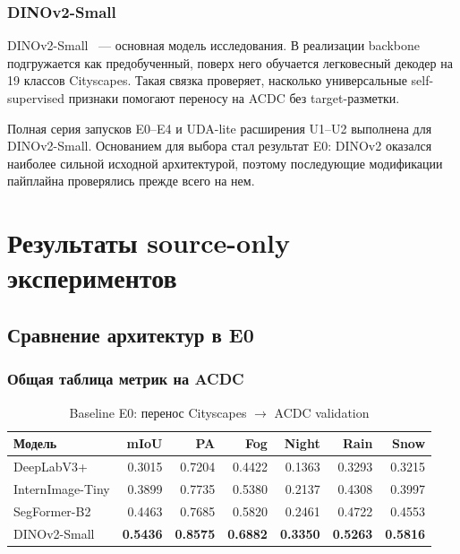 \documentclass[14pt,a4paper]{extarticle}
\begin{document}
\subsubsection{DINOv2-Small}

DINOv2-Small~\cite{oquab2023dinov2} --- основная модель исследования. В реализации backbone подгружается как предобученный, поверх него обучается легковесный декодер на 19 классов Cityscapes. Такая связка проверяет, насколько универсальные self-supervised признаки помогают переносу на ACDC без target-разметки.

Полная серия запусков E0--E4 и UDA-lite расширения U1--U2 выполнена для DINOv2-Small. Основанием для выбора стал результат E0: DINOv2 оказался наиболее сильной исходной архитектурой, поэтому последующие модификации пайплайна проверялись прежде всего на нем.

\newpage

\section{Результаты source-only экспериментов}

\subsection{Сравнение архитектур в E0}

\subsubsection{Общая таблица метрик на ACDC}

\begin{table}[H]
    \centering
    \caption{Baseline E0: перенос Cityscapes $\rightarrow$ ACDC validation}
    \label{tab:e0_architecture_comparison}
    \small
    \begin{tabular}{lrrrrrr}
        \toprule
        Модель & mIoU & PA & Fog & Night & Rain & Snow \\
        \midrule
        DeepLabV3+ & 0.3015 & 0.7204 & 0.4422 & 0.1363 & 0.3293 & 0.3215 \\
        InternImage-Tiny & 0.3899 & 0.7735 & 0.5380 & 0.2137 & 0.4308 & 0.3997 \\
        SegFormer-B2 & 0.4463 & 0.7685 & 0.5820 & 0.2461 & 0.4722 & 0.4553 \\
        DINOv2-Small & \textbf{0.5436} & \textbf{0.8575} & \textbf{0.6882} & \textbf{0.3350} & \textbf{0.5263} & \textbf{0.5816} \\
        \bottomrule
    \end{tabular}
\end{table}
\end{document}
